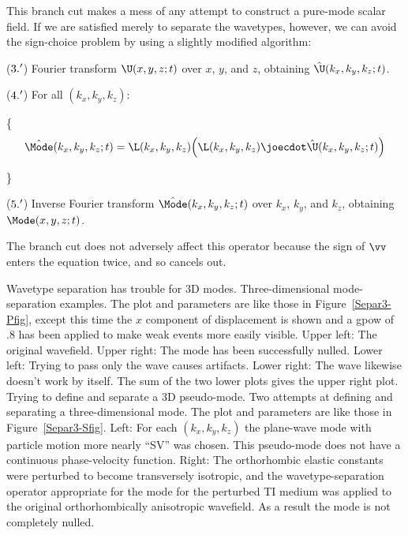 This branch cut
makes a mess of any attempt to construct a pure-mode scalar field.
If we are satisfied merely to separate the wavetypes, however, we
can avoid the sign-choice problem by using a slightly modified algorithm:
\label{Separ3-ModAlg}
\begin{list}{}{}
\item[($\hbox{\rm 3.}^\prime$)] Fourier transform $\U(x,y,z;t)$ over $x$, $y$, and $z$,
obtaining $\hat \U(k_x,k_y,k_z;t)$.
\item[($\hbox{\rm 4.}^\prime$)] For all $(k_x,k_y,k_z)$:
\item[] \{
$$ \hat \Mode(k_x,k_y,k_z;t) = \L(k_x,k_y,k_z) \Bigl( \L(k_x,k_y,k_z) \joecdot \hat \U(k_x,k_y,k_z;t) \Bigr) $$
\item[] \}
\item[($\hbox{\rm 5.}^\prime$)] Inverse Fourier transform $\hat \Mode(k_x,k_y,k_z;t)$
over $k_x$, $k_y$, and $k_z$, obtaining $\Mode(x,y,z;t)$.
\end{list}
The branch cut does not adversely affect this operator because the
sign of $\vv$ enters the equation twice, and so cancels out.

{Wavetype separation has trouble for 3D {\qS} modes.}
{Three-dimensional {\qS} mode-separation examples.
The plot and parameters are like those in Figure~\protect\ref{Separ3-Pfig},
except this time the $x$ component of displacement is shown and
a gpow of .8 has been applied to make weak events more easily visible.
Upper left: The original wavefield.
Upper right: The {\qP} mode has been successfully nulled.
Lower left: Trying to pass only the {} wave causes artifacts.
Lower right: The {} wave likewise doesn't work by itself.
The sum of the two lower plots gives the upper right plot.
}
{Trying to define and separate a 3D {\qSV} pseudo-mode.}
{Two attempts at defining and separating a three-dimensional {\qSV} mode.
The plot and parameters are like those in Figure~\protect\ref{Separ3-Sfig}.
Left: For each $(k_x,k_y,k_z)$ the {\qS} plane-wave mode with
particle motion more nearly ``SV'' was chosen. This pseudo-mode does
not have a continuous phase-velocity function.
Right: The orthorhombic elastic constants were perturbed to become
transversely isotropic, and the wavetype-separation operator appropriate for
the {\qSV} mode for the perturbed TI medium was applied to the original
orthorhombically anisotropic wavefield. As a result the {\qP} mode is
not completely nulled.
}

